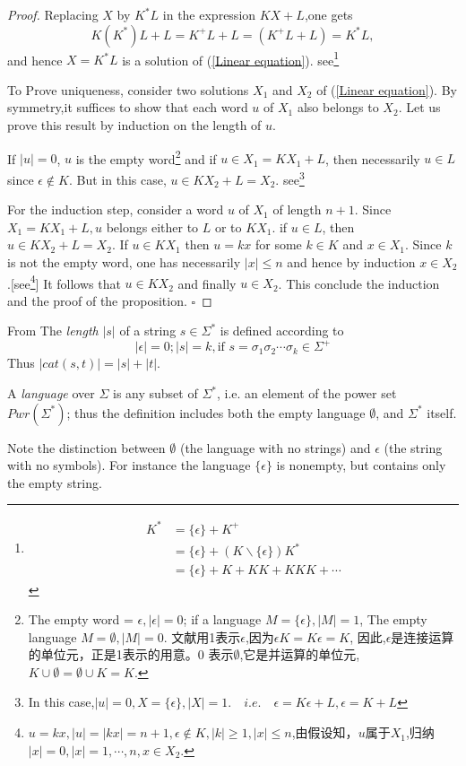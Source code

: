 \begin{proof}
	Replacing $X$ by $K^{\ast}L$ in the expression $KX+L$,one gets
	$$K(K^{\ast})L + L = K^{+}L + L = (K^{+}L + L) = K^{\ast}L,$$
	and hence $X = K^{\ast}L$ is a solution of (\ref{Linear equation}). see\footnote[1]{\begin{align*}
		K^{\ast} &= \{\epsilon\} + K^{+} \\
		&=  \{\epsilon\} + (K\backslash \{\epsilon\})K^{\ast}\\ &=\{\epsilon\} + K + KK + KKK + \cdots
		\end{align*}}\label{star}
	
	To Prove uniqueness, consider two solutions $X_{1}$ and $X_{2}$ of (\ref{Linear equation}). By symmetry,it suffices to show that each word $u$ of $X_1$ also belongs to $X_2$. Let us prove this result by induction on the length of $u$.
	
	If $|u| = 0$, $u$ is the empty word\footnote[2]{The empty word = $\epsilon,|\epsilon| = 0$; if a language $M = \{\epsilon\}, |M| = 1$, The empty language $M = \emptyset, |M| = 0$. 文献\cite{Jean2018}用1表示$\epsilon$,因为$\epsilon K = K\epsilon = K$, 因此,$\epsilon$是连接运算的单位元，正是1表示的用意。0 表示$\emptyset$,它是并运算的单位元,$K\cup \emptyset = \emptyset \cup K = K$.} and if $u \in X_1 = KX_1 + L$, then necessarily $u\in L$ since $\epsilon \notin K$. But in this case, $u\in KX_2 + L = X_2$. see\footnote[3]{In this case,$|u| = 0, X = \{\epsilon\},|X| = 1.\quad i.e.\quad\epsilon = K\epsilon + L, \epsilon = K + L$}
	
	For the induction step, consider a word $u$ of $X_1$ of length $n + 1$. Since $X_1 = KX_1 + L, u$ belongs either to $L$ or to $KX_1$. if $u\in L$, then $u\in KX_2 + L = X_2$. If $u\in KX_1$ then $u = kx$ for some $k\in K$ and $x\in X_1$. Since $k$ is not the empty word, one has necessarily $|x| \leq n$ and hence by induction $x\in X_2$.[see\footnote[4]{$u = kx,|u|=|kx|=n+1,\epsilon \notin K,|k|\ge 1,|x|\le n$,由假设知，$u$属于$X_1$,归纳$|x|=0,|x|=1,\cdots,n,x\in X_2$.}] It follows that $u\in KX_2$ and finally $u\in X_2$. This conclude the induction and the proof of the proposition.  \hfill$\square$
\end{proof}

\begin{svgraybox}
	
From \cite[p74]{Wonham2018}
The \textit{length} $|s|$ of a string $s\in \Sigma^{\ast}$ is defined according to
$$|\epsilon| = 0; |s| = k, \text{if }s = \sigma_1\sigma_2 \cdots\sigma_k\in \Sigma ^{+}$$
Thus $|cat(s,t)| = |s| + |t|$.

A \textit{language} over $\Sigma$ is any subset of $\Sigma^{\ast}$, i.e. an element of the power set $Pwr(\Sigma^{\ast})$; thus the definition includes both the empty language $\emptyset$, and $\Sigma^{\ast}$ itself.

Note the distinction between $\emptyset$ (the language with no strings) and $\epsilon$ (the string with no symbols). For instance the language $\{\epsilon\}$ is nonempty, but contains only the empty string.
\end{svgraybox}	

